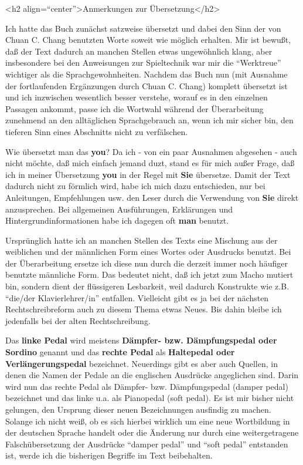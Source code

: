 
\hypertarget{ueberset}{}

<h2 align=\enquote{center}>Anmerkungen zur Übersetzung</h2>

Ich hatte das Buch zunächst satzweise übersetzt und dabei den Sinn der von Chuan C. Chang benutzten Worte soweit wie möglich erhalten.
Mir ist bewußt, daß der Text dadurch an manchen Stellen etwas ungewöhnlich klang, aber insbesondere bei den Anweisungen zur Spieltechnik war mir die \enquote{Werktreue} wichtiger als die Sprachgewohnheiten.
Nachdem das Buch nun (mit Ausnahme der fortlaufenden Ergänzungen durch Chuan C. Chang) komplett übersetzt ist und ich inzwischen wesentlich besser verstehe, worauf es in den einzelnen Passagen ankommt, passe ich die Wortwahl während der Überarbeitung zunehmend an den alltäglichen Sprachgebrauch an, wenn ich mir sicher bin, den tieferen Sinn eines Abschnitts nicht zu verfälschen.

Wie übersetzt man das \textbf{you}?
 Da ich - von ein paar Ausnahmen abgesehen - auch nicht möchte, daß mich einfach jemand duzt, stand es für mich außer Frage, daß ich in meiner Übersetzung \textbf{you} in der Regel mit \textbf{Sie} übersetze.
Damit der Text dadurch nicht zu förmlich wird, habe ich mich dazu entschieden, nur bei Anleitungen, Empfehlungen usw.
den Leser durch die Verwendung von \textbf{Sie} direkt anzusprechen.
Bei allgemeinen Ausführungen, Erklärungen und Hintergrundinformationen habe ich dagegen oft \textbf{man} benutzt.


Ursprünglich hatte ich an manchen Stellen des Texts eine Mischung aus der weiblichen und der männlichen Form eines Wortes oder Ausdrucks benutzt.
Bei der Überarbeitung ersetze ich diese nun durch die derzeit immer noch häufiger benutzte männliche Form.
Das bedeutet nicht, daß ich jetzt zum Macho mutiert bin, sondern dient der flüssigeren Lesbarkeit, weil dadurch Konstrukte wie z.B. \enquote{die/der Klavierlehrer/in} entfallen.
Vielleicht gibt es ja bei der nächsten Rechtschreibreform auch zu diesem Thema etwas Neues.
Bis dahin bleibe ich jedenfalls bei der alten Rechtschreibung.


\hypertarget{Pedale}{}

Das \textbf{linke Pedal} wird meistens \textbf{Dämpfer- bzw. Dämpfungspedal oder Sordino} genannt und das \textbf{rechte Pedal} als \textbf{Haltepedal oder Verlängerungspedal} bezeichnet.
Neuerdings gibt es aber auch Quellen, in denen die Namen der Pedale an die englischen Ausdrücke angeglichen sind.
Darin wird nun das rechte Pedal als Dämpfer- bzw. Dämpfungspedal (damper pedal) bezeichnet und das linke u.a. als Pianopedal (soft pedal).
Es ist mir bisher nicht gelungen, den Ursprung dieser neuen Bezeichnungen ausfindig zu machen.
Solange ich nicht weiß, ob es sich hierbei wirklich um eine neue Wortbildung in der deutschen Sprache handelt oder die Änderung nur durch eine weitergetragene Falschübersetzung der Ausdrücke \enquote{damper pedal} und \enquote{soft pedal} entstanden ist, werde ich die bisherigen Begriffe im Text beibehalten.

